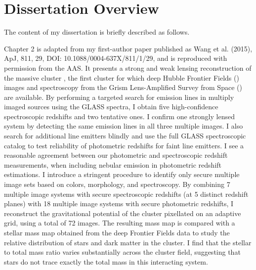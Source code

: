 \section{Dissertation Overview}

The content of my dissertation is briefly described as follows.

Chapter 2 is adapted from my first-author paper published as Wang et al. (2015), ApJ, 811, 29, DOI:
10.1088/0004-637X/811/1/29, and is reproduced with permission from the AAS.
It presents a strong and weak lensing reconstruction of the massive cluster \cler, the first cluster for
which deep Hubble Frontier Fields (\hff) images and spectroscopy from the Grism Lens-Amplified Survey from Space
(\glass) are available.
By performing a targeted search for emission lines in multiply imaged sources using the
GLASS spectra, I obtain five high-confidence spectroscopic redshifts and two tentative ones. I confirm one
strongly lensed system by detecting the same emission lines in all three multiple images. I also search for
additional line emitters blindly and use the full GLASS spectroscopic catalog to test reliability of photometric
redshifts for faint line emitters. I see a reasonable agreement between our photometric and spectroscopic
redshift measurements, when including nebular emission in photometric redshift estimations. I introduce a
stringent procedure to identify only secure multiple image sets based on colors, morphology, and spectroscopy. By
combining 7 multiple image systems with secure spectroscopic redshifts (at 5 distinct redshift planes) with 18
multiple image systems with secure photometric redshifts, I reconstruct the gravitational potential of the
cluster pixellated on an adaptive grid, using a total of 72 images. The resulting mass map is compared with a
stellar mass map obtained from the deep \spitzer Frontier Fields data to study the relative distribution of stars
and dark matter in the cluster. I find that the stellar to total mass ratio varies substantially across the
cluster field, suggesting that stars do not trace exactly the total mass in this interacting system. 

